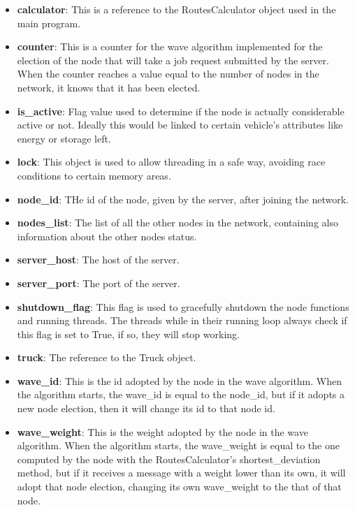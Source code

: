 \documentclass[titlepage]{article}
\begin{document}
\begin{itemize}
    \item \textbf{calculator}: This is a reference to the RoutesCalculator object used in the main program.
    \item \textbf{counter}: This is a counter for the wave algorithm implemented for the election of the node that will take a job request submitted by the server. When the counter reaches a value equal to the number of nodes in the network, it knows that it has been elected.
    \item \textbf{is\_active}: Flag value used to determine if the node is actually considerable active or not. Ideally this would be linked to certain vehicle's attributes like energy or storage left.
    \item \textbf{lock}: This object is used to allow threading in a safe way, avoiding race conditions to certain memory areas.
    \item \textbf{node\_id}: THe id of the node, given by the server, after joining the network.
    \item \textbf{nodes\_list}: The list of all the other nodes in the network, containing also information about the other nodes status.
    \item \textbf{server\_host}: The host of the server.
    \item \textbf{server\_port}: The port of the server.
    \item \textbf{shutdown\_flag}: This flag is used to gracefully shutdown the node functions and running threads. The threads while in their running loop always check if this flag is set to True, if so, they will stop working.
    \item \textbf{truck}: The reference to the Truck object.
    \item \textbf{wave\_id}: This is the id adopted by the node in the wave algorithm. When the algorithm starts, the wave\_id is equal to the node\_id, but if it adopts a new node election, then it will change its id to that node id.
    \item \textbf{wave\_weight}: This is the weight adopted by the node in the wave algorithm. When the algorithm starts, the wave\_weight is equal to the one computed by the node with the RoutesCalculator's shortest\_deviation method, but if it receives a message with a weight lower than its own, it will adopt that node election, changing its own wave\_weight to the that of that node.
\end{itemize}
\end{document}
